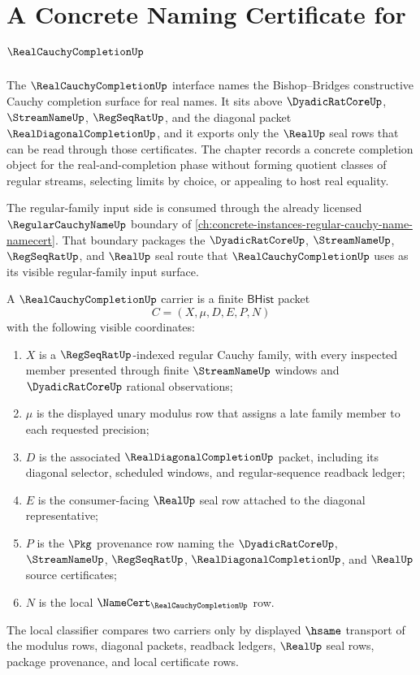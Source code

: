 \chapter{A Concrete Naming Certificate for $\RealCauchyCompletionUp$}
\label{ch:concrete-instances-real-cauchy-completion-namecert}

The $\RealCauchyCompletionUp$ interface names the Bishop--Bridges constructive Cauchy completion surface for real names. It sits above $\DyadicRatCoreUp$, $\StreamNameUp$, $\RegSeqRatUp$, and the diagonal packet $\RealDiagonalCompletionUp$, and it exports only the $\RealUp$ seal rows that can be read through those certificates. The chapter records a concrete completion object for the real-and-completion phase without forming quotient classes of regular streams, selecting limits by choice, or appealing to host real equality.

The regular-family input side is consumed through the already licensed $\RegularCauchyNameUp$ boundary of \autoref{ch:concrete-instances-regular-cauchy-name-namecert}. That boundary packages the $\DyadicRatCoreUp$, $\StreamNameUp$, $\RegSeqRatUp$, and $\RealUp$ seal route that $\RealCauchyCompletionUp$ uses as its visible regular-family input surface.

\begin{definition}
\label{def:real-cauchy-completion-carrier}
A $\RealCauchyCompletionUp$ carrier is a finite $\mathsf{BHist}$ packet
$$
C=(X,\mu,D,E,P,N)
$$
with the following visible coordinates:
\begin{enumerate}
\item $X$ is a $\RegSeqRatUp$-indexed regular Cauchy family, with every inspected member presented through finite $\StreamNameUp$ windows and $\DyadicRatCoreUp$ rational observations;
\item $\mu$ is the displayed unary modulus row that assigns a late family member to each requested precision;
\item $D$ is the associated $\RealDiagonalCompletionUp$ packet, including its diagonal selector, scheduled windows, and regular-sequence readback ledger;
\item $E$ is the consumer-facing $\RealUp$ seal row attached to the diagonal representative;
\item $P$ is the $\Pkg$ provenance row naming the $\DyadicRatCoreUp$, $\StreamNameUp$, $\RegSeqRatUp$, $\RealDiagonalCompletionUp$, and $\RealUp$ source certificates;
\item $N$ is the local $\NameCert_{\RealCauchyCompletionUp}$ row.
\end{enumerate}
The local classifier compares two carriers only by displayed $\hsame$ transport of the modulus rows, diagonal packets, readback ledgers, $\RealUp$ seal rows, package provenance, and local certificate rows.
\end{definition}

